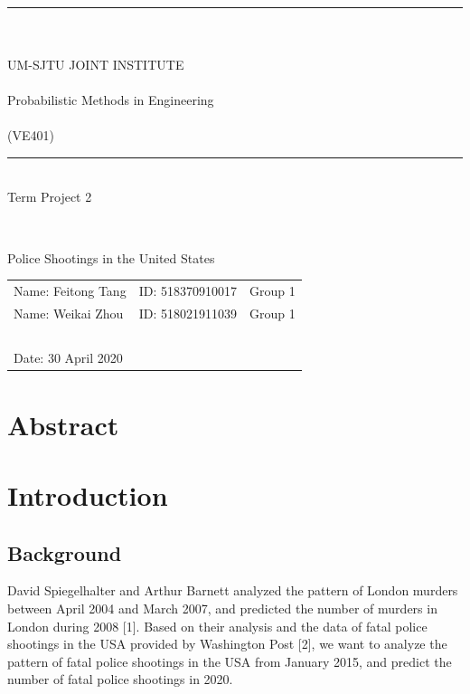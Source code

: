 \documentclass[a4paper]{article}
\begin{document}
\begin{large}
	\begin{center}
	~\\ ~\\ ~\\ ~\\ ~\\ ~\\ \rule[-1pt]{10.3cm}{0.05em} \\~\\UM-SJTU JOINT INSTITUTE\\~\\Probabilistic Methods in
Engineering\\~\\(VE401)	~\\ \rule[-1pt]{10.3cm}{0.05em} \vspace{7cm} \\Term Project 2
	\end{center}
\end{large}
~\\

\begin{large}
	\begin{center}
	Police Shootings in the United States
	\end{center}
\end{large}
\vspace{5cm}

\begin{tabular}{l l l}
	Name: Feitong Tang&ID: 518370910017&Group 1\\
	Name: Weikai Zhou&ID: 518021911039&Group 1\\
     ~\\
	Date: 30 April 2020
\end{tabular}

\newpage

\section{Abstract}
	




\newpage

\tableofcontents

\newpage

\section{Introduction}
	\subsection{Background}
	David Spiegelhalter and Arthur Barnett analyzed the pattern of London murders between April 2004 and March 2007, and predicted the number of murders in London during 2008 [1]. Based on their analysis and the data of fatal police shootings in the USA provided by Washington Post [2], we want to analyze the pattern of fatal police shootings in the USA from January 2015, and predict the number of fatal police shootings in 2020.
\end{document}

